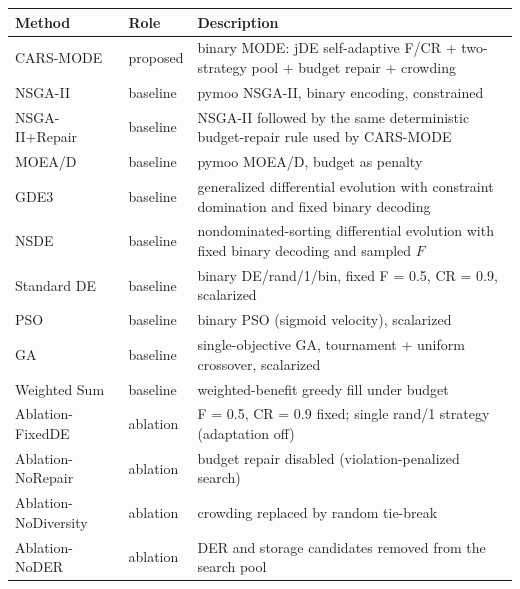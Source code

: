 \documentclass[
  10pt,
  a4paper,
]{article}
\begin{document}
\begin{longtable}[]{@{}
  >{\raggedright\arraybackslash}p{}
  >{\raggedright\arraybackslash}p{}
  >{\raggedright\arraybackslash}p{}@{}}
\toprule\noalign{}
\begin{minipage}[b]{\linewidth}\raggedright
Method
\end{minipage} & \begin{minipage}[b]{\linewidth}\raggedright
Role
\end{minipage} & \begin{minipage}[b]{\linewidth}\raggedright
Description
\end{minipage} \\
\midrule\noalign{}
\endhead
\bottomrule\noalign{}
\endlastfoot
CARS-MODE & proposed & binary MODE: jDE self-adaptive F/CR +
two-strategy pool + budget repair + crowding \\
NSGA-II & baseline & pymoo NSGA-II, binary encoding, constrained \\
NSGA-II+Repair & baseline & NSGA-II followed by the same deterministic
budget-repair rule used by CARS-MODE \\
MOEA/D & baseline & pymoo MOEA/D, budget as penalty \\
GDE3 & baseline & generalized differential evolution with constraint
domination and fixed binary decoding \\
NSDE & baseline & nondominated-sorting differential evolution with fixed
binary decoding and sampled \(F\) \\
Standard DE & baseline & binary DE/rand/1/bin, fixed F = 0.5, CR = 0.9,
scalarized \\
PSO & baseline & binary PSO (sigmoid velocity), scalarized \\
GA & baseline & single-objective GA, tournament + uniform crossover,
scalarized \\
Weighted Sum & baseline & weighted-benefit greedy fill under budget \\
Ablation-FixedDE & ablation & F = 0.5, CR = 0.9 fixed; single rand/1
strategy (adaptation off) \\
Ablation-NoRepair & ablation & budget repair disabled
(violation-penalized search) \\
Ablation-NoDiversity & ablation & crowding replaced by random
tie-break \\
Ablation-NoDER & ablation & DER and storage candidates removed from the
search pool \\
\end{longtable}
\end{document}
